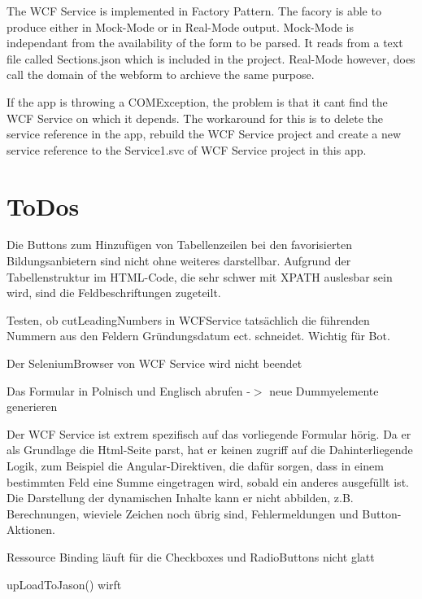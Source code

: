 The W\+CF Service is implemented in Factory Pattern. The facory is able to produce either in Mock-\/\+Mode or in Real-\/\+Mode output. Mock-\/\+Mode is independant from the availability of the form to be parsed. It reads from a text file called Sections.\+json which is included in the project. Real-\/\+Mode however, does call the domain of the webform to archieve the same purpose.

If the app is throwing a C\+O\+M\+Exception, the problem is that it can\textquotesingle{}t find the W\+CF Service on which it depends. The workaround for this is to delete the service reference in the app, rebuild the W\+CF Service project and create a new service reference to the Service1.\+svc of W\+CF Service project in this app.\hypertarget{index_third}{}\section{To\+Dos}\label{index_third}

\begin{DoxyItemize}
\item Die Buttons zum Hinzufügen von Tabellenzeilen bei den favorisierten Bildungsanbietern sind nicht ohne weiteres darstellbar. Aufgrund der Tabellenstruktur im H\+T\+M\+L-\/\+Code, die sehr schwer mit X\+P\+A\+TH auslesbar sein wird, sind die Feldbeschriftungen zugeteilt.
\item Testen, ob cut\+Leading\+Numbers in W\+C\+F\+Service tatsächlich die führenden Nummern aus den Feldern Gründungsdatum ect. schneidet. Wichtig für Bot.
\item Der Selenium\+Browser von W\+CF Service wird nicht beendet
\item Das Formular in Polnisch und Englisch abrufen -\/$>$ neue Dummyelemente generieren
\item Der W\+CF Service ist extrem spezifisch auf das vorliegende Formular hörig. Da er als Grundlage die Html-\/\+Seite parst, hat er keinen zugriff auf die Dahinterliegende Logik, zum Beispiel die Angular-\/\+Direktiven, die dafür sorgen, dass in einem bestimmten Feld eine Summe eingetragen wird, sobald ein anderes ausgefüllt ist. Die Darstellung der dynamischen Inhalte kann er nicht abbilden, z.\+B. Berechnungen, wieviele Zeichen noch übrig sind, Fehlermeldungen und Button-\/\+Aktionen.
\item Ressource Binding läuft für die Checkboxes und Radio\+Buttons nicht glatt
\item up\+Load\+To\+Jason() wirft
\end{DoxyItemize}


